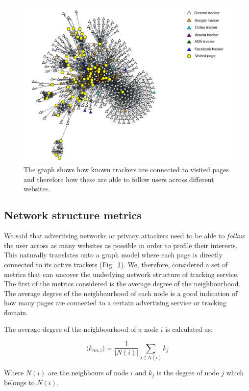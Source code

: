\begin{figure}
\includegraphics[width=\textwidth]{figures/graph-map.png}
\caption[Connections between trackers and visited pages]{The graph shows how known trackers are connected to visited pages and therefore how these are able to follow users across different websites.}
\label{fig:graph-map}
\end{figure}

\subsection{Network structure metrics}
\noindent
We said that advertising networks or privacy attackers need to be able to \emph{follow} the user across as many websites as possible in order to profile their interests. This naturally translates onto a graph model where each page is directly connected to its active trackers (Fig.~\ref{fig:graph-map}).
We, therefore, considered a set of metrics that can uncover the underlying network structure of tracking service. The first of the metrics considered is the average degree of the neighbourhood. The average degree of the neighbourhood of each node is a good indication of how many pages are connected to a certain advertising service or tracking domain.

The average degree of the neighbourhood of a node $i$ is calculated as:

$$ \langle k_{nn,i} \rangle= \frac{1}{| N(i) |} \sum_{j \in N(i) } {k_j} $$

Where $N(i)$ are the neighbours of node $i$ and $k_j$ is the degree of node $j$ which belongs to $N(i)$.

